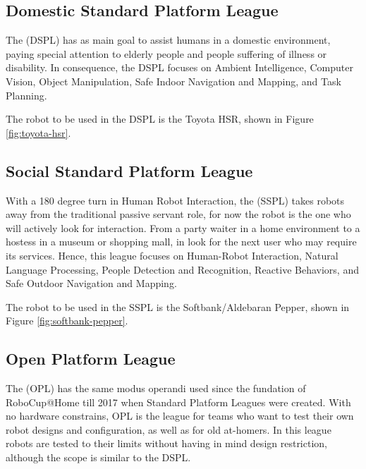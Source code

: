 \subsection{Domestic Standard Platform League}
The (DSPL) has as main goal to assist humans in a domestic environment, paying special attention to elderly people and people suffering of illness or disability. In consequence, the DSPL focuses on Ambient Intelligence, Computer Vision, Object Manipulation, Safe Indoor Navigation and Mapping, and Task Planning.

The robot to be used in the DSPL is the Toyota HSR, shown in Figure \ref{fig:toyota-hsr}.

\subsection{Social Standard Platform League}
With a 180 degree turn in Human Robot Interaction, the (SSPL) takes robots away from the traditional passive servant role, for now the robot is the one who will actively look for interaction. From a party waiter in a home environment to a hostess in a museum or shopping mall, in  look for the next user who may require its services. Hence, this league focuses on Human-Robot Interaction, Natural Language Processing, People Detection and Recognition, Reactive Behaviors, and Safe Outdoor Navigation and Mapping.

The robot to be used in the SSPL is the Softbank/Aldebaran Pepper, shown in Figure \ref{fig:softbank-pepper}.

\subsection{Open Platform League}
The (OPL) has the same modus operandi used since the fundation of RoboCup@Home till 2017 when Standard Platform Leagues were created. With no hardware constrains, OPL is the league for teams who want to test their own robot designs and configuration, as well as for old at-homers. In this league robots are tested to their limits without having in mind design restriction, although the scope is similar to the DSPL. 